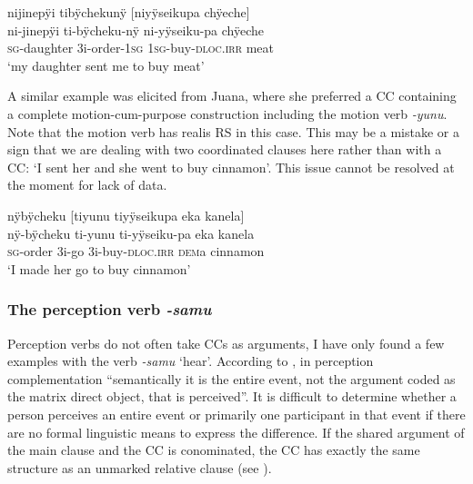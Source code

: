 \ea\label{ex:send-dloc}
\begingl
\glpreamble nijinepÿi tibÿchekunÿ \textup{[}niyÿseikupa chÿeche\textup{]}\\
\gla ni-jinepÿi ti-bÿcheku-nÿ ni-yÿseiku-pa chÿeche\\
\textsc{sg}-daughter 3i-order-1\textsc{sg} 1\textsc{sg}-buy-\textsc{dloc.irr} meat\\
\glft ‘my daughter sent me to buy meat’
\endgl
\trailingcitation{[mxx-e160811sd.291]}%
\xe

A similar example was elicited from Juana, where she preferred a CC containing a complete motion-cum-purpose construction including the motion verb \textit{-yunu}. Note that the motion verb has realis RS in this case. This may be a mistake or a sign that we are dealing with two coordinated clauses here rather than with a CC: ‘I sent her and she went to buy cinnamon’. This issue cannot be resolved at the moment for lack of data.

\ea\label{ex:send-MCPC}
\begingl
\glpreamble nÿbÿcheku \textup{[}tiyunu tiyÿseikupa eka kanela\textup{]}\\
\gla nÿ-bÿcheku ti-yunu ti-yÿseiku-pa eka kanela\\
\textsc{sg}-order 3i-go 3i-buy-\textsc{dloc.irr} \textsc{dem}a cinnamon\\
\glft ‘I made her go to buy cinnamon’
\endgl
\trailingcitation{[jxx-e191021e-2]}
\xe 



\subsubsection{The perception verb \textit{-samu}}\label{sec:CC_Perception}

Perception verbs do not often take CCs as arguments, I have only found a few examples with the verb \textit{-samu} ‘hear’.  
According to \citet[143]{Noonan2007}, in perception complementation “semantically it is the entire event, not the argument coded as the matrix direct object, that is perceived”. It is difficult to determine whether a person perceives an entire event or primarily one participant in that event if there are no formal linguistic means to express the difference. If the shared argument of the main clause and the CC is conominated, the CC has exactly the same structure as an unmarked relative clause (see ). 


